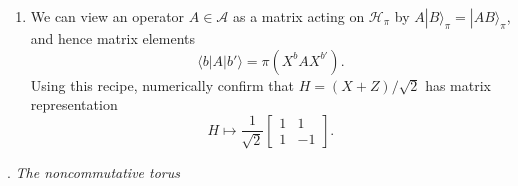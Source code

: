 \begin{enumerate}[label=(\alph*), itemsep=-1pt]
\begin{enumerate}[label=\roman*., itemsep=-1pt]
\[    \]
    Check using \texttt{yaw} that the vectors associated to $I \mapsto
    |0\rangle$ and $X \mapsto |1\rangle$ (or simply $X^b \mapsto
    |b\rangle$) constitute an orthonormal basis for this space.
\item We can view an operator $A \in \mathcal{A}$ as a matrix acting
  on $\mathcal{H}_\pi$ by $A |B\rangle_\pi = |AB\rangle_\pi$, and
  hence matrix elements
  \[
    \langle b| A |b'\rangle = \pi (X^b A X^{b'}).
  \]
  Using this recipe, numerically confirm that $H = (X + Z)/\sqrt{2}$
  has matrix representation
  \[
    H \mapsto \frac{1}{\sqrt{2}}
    \begin{bmatrix}
      1 & 1 \\ 1 & -1
    \end{bmatrix}.
  \]
  \end{enumerate}
    \end{enumerate}
      
\vspace{5pt}
\begin{Large}
  . \emph{The noncommutative torus} 
\end{Large}
\vspace{5pt}

